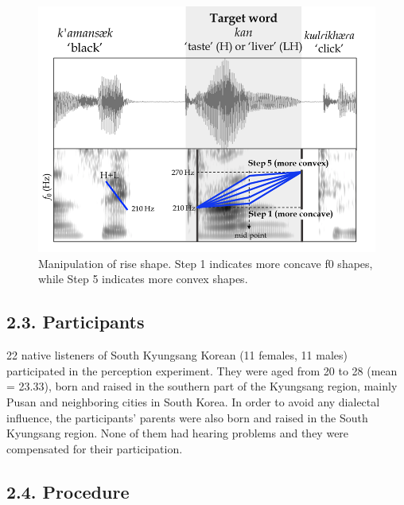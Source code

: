 \documentclass[
  man,floatsintext]{apa6}
\begin{document}
\begin{figure}[H]

{\centering \includegraphics[width=0.7\linewidth]{images/picture4} 

}

\caption{Manipulation of rise shape. Step 1 indicates more concave f0 shapes, while Step 5 indicates more convex shapes.}\label{fig:picture4}
\end{figure}

\hypertarget{participants}{%
\subsection{2.3. Participants}\label{participants}}

22 native listeners of South Kyungsang Korean (11 females, 11 males) participated in the perception experiment. They were aged from 20 to 28 (mean = 23.33), born and raised in the southern part of the Kyungsang region, mainly Pusan and neighboring cities in South Korea. In order to avoid any dialectal influence, the participants' parents were also born and raised in the South Kyungsang region. None of them had hearing problems and they were compensated for their participation.

\hypertarget{procedure}{%
\subsection{2.4. Procedure}\label{procedure}}
\end{document}
